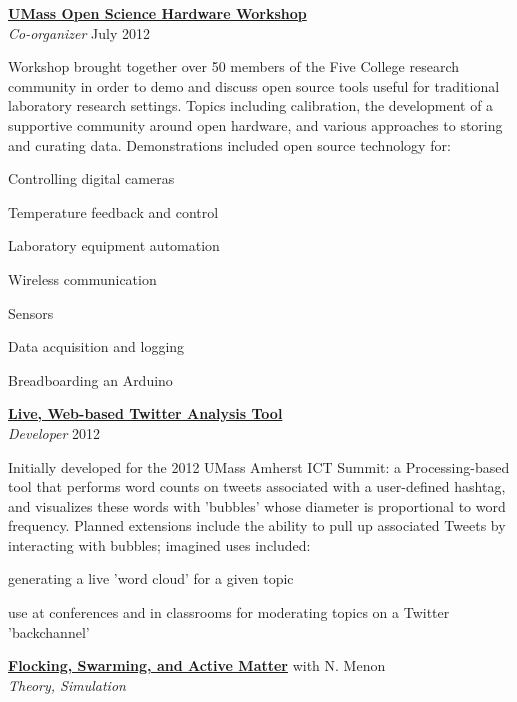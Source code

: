 \documentclass[10pt]{article}
\newcommand{\blankline}{\quad\pagebreak[3]}
\newcommand{\halfblankline}{\quad\vspace{-0.5\baselineskip}\pagebreak[3]}
\begin{document}
\blankline

\href{https://github.com/dwblair/UMass-Open-Science-Hardware/wiki/Workshop-Summary}{\textbf{UMass Open Science Hardware Workshop}} \\
\emph{Co-organizer} \hfill {July 2012} 

\halfblankline

Workshop brought together over 50 members of the Five College research community in order to demo and discuss open source tools useful for traditional laboratory research settings. Topics including calibration, the development of a supportive community around open hardware, and various approaches to storing and curating data.
Demonstrations included open source technology for:
    \begin{innerlist}
        \item Controlling digital cameras
        \item Temperature feedback and control
        \item Laboratory equipment automation
\item Wireless communication 
\item Sensors
\item Data acquisition and logging
\item Breadboarding an Arduino
\end{innerlist}

\blankline

\href{http://dwblair.github.io}{\textbf{Live, Web-based Twitter Analysis Tool }}\\
\emph{Developer} \hfill {2012}

\halfblankline

Initially developed for the 2012 UMass Amherst ICT Summit: a Processing-based tool that performs word counts on tweets associated with a user-defined hashtag, and visualizes these words with 'bubbles' whose diameter is proportional to word frequency. Planned extensions include the ability to pull up associated Tweets by interacting with bubbles; imagined uses included: 
 \begin{innerlist}
        \item generating a live 'word cloud' for a given topic
\item use at conferences and in classrooms for moderating topics on a Twitter 'backchannel' 
\end{innerlist}


\blankline

\href{http://dwblair.github.io}{\textbf{Flocking, Swarming, and Active Matter}} \hfill {with N. Menon} \\
\emph{Theory, Simulation}
\end{document}

